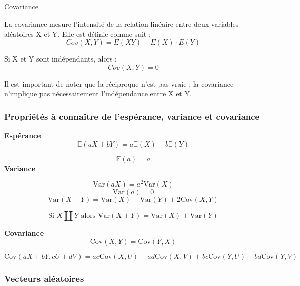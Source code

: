 \documentclass[
  letterpaper,
  DIV=11,
  numbers=noendperiod]{scrartcl}
\makeatletter
\let\oldsubparagraph\subparagraph
\renewcommand{\subparagraph}{
    \@ifstar
      \xxxSubParagraphStar
      \xxxSubParagraphNoStar
  }
\newcommand{\xxxSubParagraphStar}[1]{\oldsubparagraph*{#1}\mbox{}}
\newcommand{\xxxSubParagraphNoStar}[1]{\oldsubparagraph{#1}\mbox{}}
\makeatother
\begin{document}
\subparagraph{Covariance}\label{covariance}

La covariance mesure l'intensité de la relation linéaire entre deux
variables aléatoires X et Y. Elle est définie comme suit :
\[Cov(X, Y) = E(XY) - E(X) \cdot E(Y)\]

Si X et Y sont indépendants, alors : \[Cov(X, Y) = 0\]

\begin{tcolorbox}[enhanced jigsaw, opacityback=0, toptitle=1mm, bottomtitle=1mm, rightrule=.15mm, colframe=quarto-callout-warning-color-frame, leftrule=.75mm, titlerule=0mm, breakable, bottomrule=.15mm, colbacktitle=quarto-callout-warning-color!10!white, coltitle=black, arc=.35mm, left=2mm, colback=white, toprule=.15mm, title=\textcolor{quarto-callout-warning-color}{\faExclamationTriangle}\hspace{0.5em}{Warning}, opacitybacktitle=0.6]

Il est important de noter que la réciproque n'est pas vraie : la
covariance n'implique pas nécessairement l'indépendance entre X et Y.

\end{tcolorbox}

\newpage

\subsubsection{Propriétés à connaître de l'espérance, variance et
covariance}\label{propriuxe9tuxe9s-uxe0-connauxeetre-de-lespuxe9rance-variance-et-covariance}

\textbf{Espérance} \[
\mathbb{E}(aX + bY) = a\mathbb{E}(X) + b\mathbb{E}(Y)
\]

\[
\mathbb{E}(a) = a
\] \textbf{Variance}

\[
\text{Var}(aX) = a^2\text{Var}(X)
\] \[
\text{Var}(a) = 0
\] \[
\text{Var}(X + Y) = \text{Var}(X) + \text{Var}(Y) + 2\text{Cov}(X,Y)
\]

\[ \text{Si } X \coprod Y \text{ alors } \text{Var}(X+Y) = \text{Var}(X) + \text{Var}(Y)\]

\textbf{Covariance} \[
\text{Cov}(X, Y) = \text{Cov}(Y, X)
\]

\[
\text{Cov}(aX + bY, cU + dV) = ac\text{Cov}(X, U) + ad\text{Cov}(X, V) + bc\text{Cov}(Y, U) + bd\text{Cov}(Y, V)
\]

\newpage

\subsubsection{Vecteurs aléatoires}\label{vecteurs-aluxe9atoires}
\end{document}
